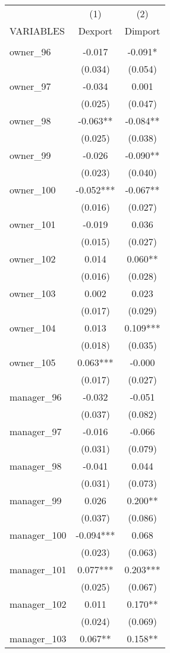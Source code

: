 \begin{tabular}{lcc} \hline
 & (1) & (2) \\
VARIABLES & Dexport & Dimport \\ \hline
 &  &  \\
owner\_96 & -0.017 & -0.091* \\
 & (0.034) & (0.054) \\
owner\_97 & -0.034 & 0.001 \\
 & (0.025) & (0.047) \\
owner\_98 & -0.063** & -0.084** \\
 & (0.025) & (0.038) \\
owner\_99 & -0.026 & -0.090** \\
 & (0.023) & (0.040) \\
owner\_100 & -0.052*** & -0.067** \\
 & (0.016) & (0.027) \\
owner\_101 & -0.019 & 0.036 \\
 & (0.015) & (0.027) \\
owner\_102 & 0.014 & 0.060** \\
 & (0.016) & (0.028) \\
owner\_103 & 0.002 & 0.023 \\
 & (0.017) & (0.029) \\
owner\_104 & 0.013 & 0.109*** \\
 & (0.018) & (0.035) \\
owner\_105 & 0.063*** & -0.000 \\
 & (0.017) & (0.027) \\
manager\_96 & -0.032 & -0.051 \\
 & (0.037) & (0.082) \\
manager\_97 & -0.016 & -0.066 \\
 & (0.031) & (0.079) \\
manager\_98 & -0.041 & 0.044 \\
 & (0.031) & (0.073) \\
manager\_99 & 0.026 & 0.200** \\
 & (0.037) & (0.086) \\
manager\_100 & -0.094*** & 0.068 \\
 & (0.023) & (0.063) \\
manager\_101 & 0.077*** & 0.203*** \\
 & (0.025) & (0.067) \\
manager\_102 & 0.011 & 0.170** \\
 & (0.024) & (0.069) \\
manager\_103 & 0.067** & 0.158** \\

\end{tabular}
